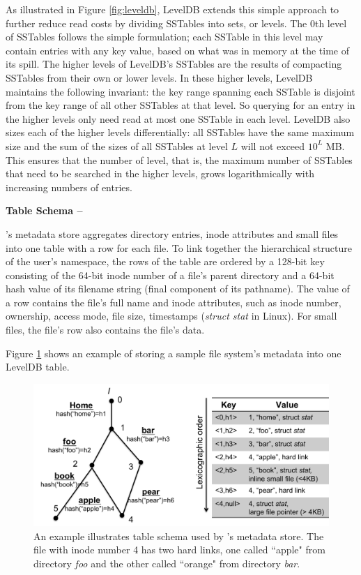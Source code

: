 As illustrated in Figure \ref{fig:leveldb}, LevelDB extends this simple approach to further reduce read costs by dividing SSTables into sets, or levels.
The 0th level of SSTables follows the simple formulation; each SSTable in this level may contain entries with any key value, based on what was in memory at the time of its spill.
The higher levels of LevelDB's SSTables are the results of compacting SSTables from their own or lower levels.
In these higher levels, LevelDB maintains the following invariant: the key range spanning each SSTable is disjoint from the key range of all other SSTables at that level.
So querying for an entry in the higher levels only need read at most one SSTable in each level.
LevelDB also sizes each of the higher levels differentially:  all SSTables have the same maximum size and the sum of the sizes of all SSTables at level $L$ will not exceed $10^L$ MB.
This ensures that the number of level, that is, the maximum number of SSTables that need to be searched in the higher levels, grows logarithmically with increasing numbers of entries.

\textbf{Table Schema --}

\giga's metadata store aggregates directory entries, 
inode attributes and small files into one \ldb table with a row for each file.
To link together the hierarchical structure of the user's namespace,
the rows of the table are ordered by a 128-bit key consisting of 
the 64-bit inode number of a file's parent directory 
and a 64-bit hash value of its filename string (final component of its pathname).
The value of a row contains the file's full name and inode attributes,
such as inode number, ownership, access mode, file size, timestamps (\textit{struct stat} in Linux).
For small files, the file's row also contains the file's data.

Figure \ref{fig:schema} shows an example of storing a sample file system's metadata into one LevelDB table.
\begin{figure}[!ht]
\centering
\includegraphics[scale=0.35]{figs/schema}
\caption{An example illustrates table schema used by \tfs's metadata store.
         The file with inode number 4 has two hard links,
         one called ``apple" from directory \textit{foo} and 
         the other called ``orange" from directory \textit{bar}.}
\label{fig:schema}
\end{figure}

